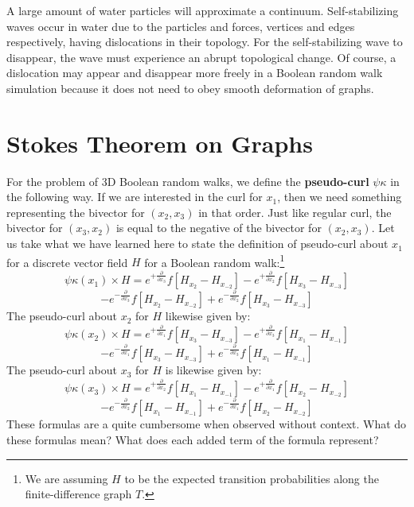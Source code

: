 \documentclass[10pt, a5paper, twoside, openright]{memoir}
\begin{document}
A large amount of water particles will approximate a continuum. Self-stabilizing waves occur in water due to the particles and forces, vertices and edges respectively, having dislocations in their topology. For the self-stabilizing wave to disappear, the wave must experience an abrupt topological change. Of course, a dislocation may appear and disappear more freely in a Boolean random walk simulation because it does not need to obey smooth deformation of graphs. 

\section{Stokes Theorem on Graphs}
For the problem of 3D Boolean random walks, we define the \textbf{pseudo-curl} $\psi \kappa$ in the following way. If we are interested in the curl for $x_1$, then we need something representing the bivector for $(x_2, x_3)$ in that order. Just like regular curl, the bivector for $(x_3, x_2)$ is equal to the negative of the bivector for $(x_2, x_3)$. Let us take what we have learned here to state the definition of pseudo-curl about $x_1$ for a discrete vector field $H$ for a Boolean random walk:\footnote{We are assuming $H$ to be the expected transition probabilities along the finite-difference graph $T$.}
$$\psi \kappa (x_1) \times H = 
e^{+\frac{\partial}{\partial x_3}} f[H_{x_2} - H_{x_{-2}}] 
-e^{+\frac{\partial}{\partial x_2}} f[H_{x_3} - H_{x_{-3}}]
$$
$$
-e^{-\frac{\partial}{\partial x_3}} f[H_{x_2} - H_{x_{-2}}]
+e^{-\frac{\partial}{\partial x_2}} f[H_{x_3} - H_{x_{-3}}]
$$
The pseudo-curl about $x_2$ for $H$ likewise given by:
$$\psi \kappa (x_2) \times H = 
e^{+\frac{\partial}{\partial x_1}} f[H_{x_3} - H_{x_{-3}}] 
-e^{+\frac{\partial}{\partial x_3}} f[H_{x_1} - H_{x_{-1}}]
$$
$$
-e^{-\frac{\partial}{\partial x_1}} f[H_{x_3} - H_{x_{-3}}]
+e^{-\frac{\partial}{\partial x_3}} f[H_{x_1} - H_{x_{-1}}]
$$
The pseudo-curl about $x_3$ for $H$ is likewise given by:
$$\psi \kappa (x_3) \times H = 
e^{+\frac{\partial}{\partial x_2}} f[H_{x_1} - H_{x_{-1}}] 
-e^{+\frac{\partial}{\partial x_1}} f[H_{x_2} - H_{x_{-2}}]
$$
$$
-e^{-\frac{\partial}{\partial x_2}} f[H_{x_1} - H_{x_{-1}}]
+e^{-\frac{\partial}{\partial x_1}} f[H_{x_2} - H_{x_{-2}}]
$$
These formulas are a quite cumbersome when observed without context. What do these formulas mean? What does each added term of the formula represent?
\end{document}
